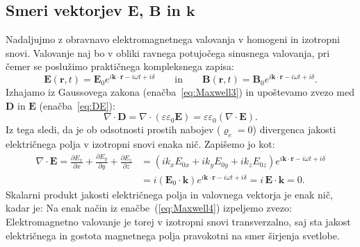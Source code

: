 \subsection*{Smeri vektorjev $\mathbf{E}$, $\mathbf{B}$ in $\mathbf{k}$}
Nadaljujmo z obravnavo elektromagnetnega valovanja v homogeni in izotropni snovi. 
Valovanje naj bo v obliki ravnega potujočega sinusnega valovanja, pri čemer se poslužimo praktičnega kompleksnega zapisa:
\begin{equation}
\mathbf{E}(\mathbf{r},t) = \mathbf{E}_0 e^{i\mathbf{k}\cdot \mathbf{r} - i\omega t + i\delta}
\qquad \mathrm{in} \qquad
\mathbf{B}(\mathbf{r},t) = \mathbf{B}_0 e^{i\mathbf{k}\cdot \mathbf{r} - i\omega t + i\delta}.
\label{eq:ravnivalkompleks}
\end{equation}
Izhajamo iz Gaussovega zakona (enačba~\ref{eq:Maxwell3}) in upoštevamo zvezo med 
$\mathbf{D}$ in $\mathbf{E}$ (enačba~\ref{eq:DE}): 
\begin{equation}
\nabla \cdot \mathbf{D} = \nabla \cdot \left( \varepsilon \varepsilon_0 \mathbf{E}\right) 
= \varepsilon \varepsilon_0 \left(\nabla \cdot \mathbf{E} \right)\!.
\label{eq:03_20}
\end{equation}
Iz tega sledi, da je ob odsotnosti prostih nabojev ($\varrho_{e} = 0$) divergenca 
jakosti električnega polja v izotropni snovi enaka nič.
Zapišemo jo kot:
\begin{align}
\nabla \cdot \mathbf{E} = \frac{\partial E_x}{\partial x}+ \frac{\partial E_y}{\partial y}+
\frac{\partial E_z}{\partial z} &= \left(ik_xE_{0x} + ik_yE_{0y} + ik_zE_{0z}\right)
e^{i\mathbf{k}\cdot \mathbf{r} - i\omega t + i\delta}\nonumber\\
&= i \left( \mathbf{E}_0 \cdot \mathbf{k} \right) e^{i\mathbf{k}\cdot \mathbf{r} - i\omega t + i\delta} = 
i\, \mathbf{E} \cdot \mathbf{k} = 0.
\label{eq:03_21}
\end{align}
Skalarni produkt jakosti električnega polja in valovnega vektorja je enak nič, kadar je:
Na enak način iz enačbe~(\ref{eq:Maxwell4}) izpeljemo zvezo:
Elektromagnetno valovanje je torej v izotropni snovi transverzalno, saj sta jakost
električnega in gostota magnetnega polja pravokotni na smer širjenja svetlobe.

